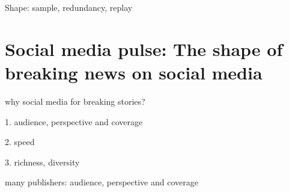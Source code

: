 \documentclass{beamer}
\begin{document}
\begin{frame}
\begin{center}
{\Huge Shape: sample, redundancy, replay }
\end{center}
\end{frame}

%
%

\section{Social media pulse: The shape of breaking news on social media}
\begin{frame}
\begin{center}
{\Huge \insertsection }
\end{center}
\end{frame}


\begin{frame}
\begin{center}
{\Huge why social media for breaking stories? }
\end{center}
\end{frame}


\begin{frame}
\begin{center}
{\Huge 1. audience, perspective and coverage }
\end{center}
\end{frame}

\begin{frame}
\begin{center}
{\Huge 2. speed }
\end{center}
\end{frame}

\begin{frame}
\begin{center}
{\Huge 3. richness, diversity }
\end{center}
\end{frame}


\begin{frame}
\begin{center}
{\Huge many publishers: audience, perspective and coverage }
\end{center}
\end{frame}
\end{document}
